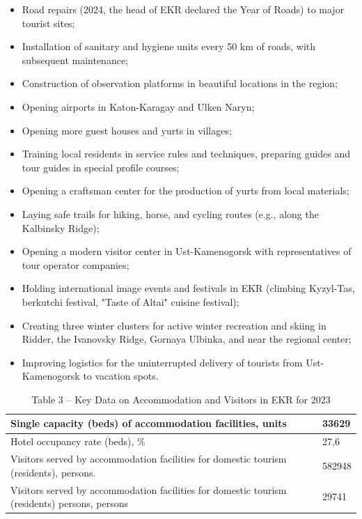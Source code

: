 \begin{multicols}{2}
\begin{itemize}
\item
  Road repairs (2024, the head of EKR declared the Year of Roads) to
  major tourist sites;
\item
  Installation of sanitary and hygiene units every 50 km of roads, with
  subsequent maintenance;
\item
  Construction of observation platforms in beautiful locations in the
  region;
\item
  Opening airports in Katon-Karagay and Ulken Naryn;
\item
  Opening more guest houses and yurts in villages;
\item
  Training local residents in service rules and techniques, preparing
  guides and tour guides in special profile courses;
\item
  Opening a craftsman center for the production of yurts from local
  materials;
\item
  Laying safe trails for hiking, horse, and cycling routes (e.g., along
  the Kalbinsky Ridge);
\item
  Opening a modern visitor center in Ust-Kamenogorsk with
  representatives of tour operator companies;
\item
  Holding international image events and festivals in EKR (climbing
  Kyzyl-Tas, berkutchi festival, "Taste of Altai" cuisine festival);
\item
  Creating three winter clusters for active winter recreation and skiing
  in Ridder, the Ivanovsky Ridge, Gornaya Ulbinka, and near the regional
  center;
\item
  Improving logistics for the uninterrupted delivery of tourists from
  Ust-Kamenogorsk to vacation spots.
\end{itemize}
\end{multicols}

\begin{table}[H]
\caption*{Table 3 -- Key Data on Accommodation and Visitors in EKR for 2023}
\centering
\begin{tabular}{|p{}|l|}
\hline
Single capacity (beds) of accommodation facilities, units & 33629 \\ \hline
Hotel occupancy rate (beds), \% & 27,6 \\ \hline
Visitors served by accommodation facilities for domestic tourism (residents), persons. & 582948 \\ \hline
Visitors served by accommodation facilities for domestic tourism (residents) persons, persons & 29741 \\ \hline
\end{tabular}
\end{table}

